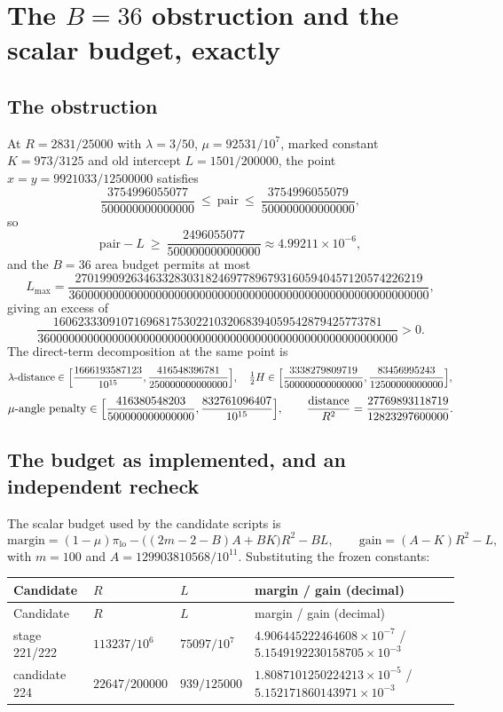 \section{The $B=36$ obstruction and the scalar budget, exactly}
\label{app:budget}
\label{sec:budget-recheck}

\subsection{The obstruction}

At $R=2831/25000$ with $\lambda=3/50$, $\mu=92531/10^{7}$, marked constant $K=973/3125$ and old
intercept $L=1501/200000$, the point $x=y=9921033/12500000$ satisfies
\[
\frac{3754996055077}{500000000000000}\ \le\ \text{pair}\ \le\
\frac{3754996055079}{500000000000000},
\]
so
\[
\text{pair}-L\ \ge\ \frac{2496055077}{500000000000000}\approx4.99211\times10^{-6},
\]
and the $B=36$ area budget permits at most
\[
L_{\max}=\frac{27019909263463328303182469778967931605940457120574226219}
{3600000000000000000000000000000000000000000000000000000000},
\]
giving an excess of
\[
\frac{16062333091071696817530221032068394059542879425773781}
{3600000000000000000000000000000000000000000000000000000000}>0 .
\]
The direct-term decomposition at the same point is
\[
\lambda\text{-distance}\in\Bigl[\frac{1666193587123}{10^{15}},\frac{416548396781}{250000000000000}\Bigr],
\quad
\tfrac12H\in\Bigl[\frac{3338279809719}{500000000000000},\frac{83456995243}{12500000000000}\Bigr],
\]
\[
\mu\text{-angle penalty}\in\Bigl[\frac{416380548203}{500000000000000},\frac{832761096407}{10^{15}}\Bigr],
\qquad
\frac{\text{distance}}{R^2}=\frac{27769893118719}{12823297600000}.
\]

\subsection{The budget as implemented, and an independent recheck}

The scalar budget used by the candidate scripts is
\[
\text{margin}=(1-\mu)\pi_{\text{lo}}-\bigl((2m-2-B)A+BK\bigr)R^2-BL,
\qquad
\text{gain}=(A-K)R^2-L,
\]
with $m=100$ and $A=129903810568/10^{11}$. Substituting the frozen constants:
{\footnotesize
\begin{longtable}{@{}llll@{}}
\toprule
Candidate & $R$ & $L$ & margin / gain (decimal) \\
\midrule
\endfirsthead
\toprule
Candidate & $R$ & $L$ & margin / gain (decimal) \\
\midrule
\endhead
\bottomrule
\endlastfoot
stage 221/222 & $113237/10^{6}$ & $75097/10^{7}$ &
$4.906445222464608\times10^{-7}$ \;/\; $5.1549192230158705\times10^{-3}$ \\
candidate 224 & $22647/200000$ & $939/125000$ &
$1.8087101250224213\times10^{-5}$ \;/\; $5.152171860143971\times10^{-3}$ \\
\end{longtable}}


